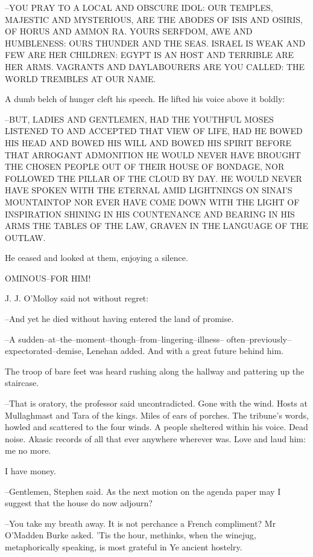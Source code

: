 --YOU PRAY TO A LOCAL AND OBSCURE IDOL: OUR TEMPLES, MAJESTIC AND
MYSTERIOUS, ARE THE ABODES OF ISIS AND OSIRIS, OF HORUS AND AMMON RA.
YOURS SERFDOM, AWE AND HUMBLENESS: OURS THUNDER AND THE SEAS. ISRAEL IS
WEAK AND FEW ARE HER CHILDREN: EGYPT IS AN HOST AND TERRIBLE ARE HER ARMS.
 VAGRANTS AND DAYLABOURERS ARE YOU CALLED: THE WORLD TREMBLES AT OUR NAME.

A dumb belch of hunger cleft his speech. He lifted his voice above it
boldly:

--BUT, LADIES AND GENTLEMEN, HAD THE YOUTHFUL MOSES LISTENED TO AND
ACCEPTED THAT VIEW OF LIFE, HAD HE BOWED HIS HEAD AND BOWED HIS WILL AND
BOWED HIS SPIRIT BEFORE THAT ARROGANT ADMONITION HE WOULD NEVER HAVE
BROUGHT THE CHOSEN PEOPLE OUT OF THEIR HOUSE OF BONDAGE, NOR FOLLOWED THE
PILLAR OF THE CLOUD BY DAY. HE WOULD NEVER HAVE SPOKEN WITH THE ETERNAL
AMID LIGHTNINGS ON SINAI'S MOUNTAINTOP NOR EVER HAVE COME DOWN WITH THE
LIGHT OF INSPIRATION SHINING IN HIS COUNTENANCE AND BEARING IN HIS ARMS
THE TABLES OF THE LAW, GRAVEN IN THE LANGUAGE OF THE OUTLAW.

He ceased and looked at them, enjoying a silence.


    OMINOUS--FOR HIM!


J. J. O'Molloy said not without regret:

--And yet he died without having entered the land of promise.

--A sudden--at--the--moment--though--from--lingering--illness--
often--previously--expectorated--demise, Lenehan added. And with a
great future behind him.

The troop of bare feet was heard rushing along the hallway and
pattering up the staircase.

--That is oratory, the professor said uncontradicted. Gone with the wind.
Hosts at Mullaghmast and Tara of the kings. Miles of ears of porches.
The tribune's words, howled and scattered to the four winds. A people
sheltered within his voice. Dead noise. Akasic records of all that ever
anywhere wherever was. Love and laud him: me no more.

I have money.

--Gentlemen, Stephen said. As the next motion on the agenda paper may I
suggest that the house do now adjourn?

--You take my breath away. It is not perchance a French compliment? Mr
O'Madden Burke asked. 'Tis the hour, methinks, when the winejug,
metaphorically speaking, is most grateful in Ye ancient hostelry.

